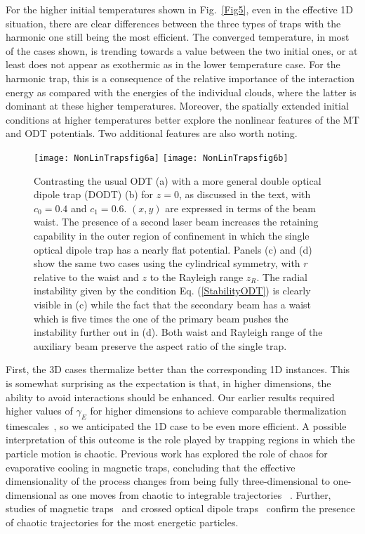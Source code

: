 \documentclass[pra,letterpaper,onecolumn,superscriptaddress,floatfix]{revtex4}
\begin{document}
For the higher initial temperatures shown in Fig.~\ref{Fig5}, even in the effective 1D situation, there are 
clear differences between the three types of traps with the harmonic one still being the most efficient. 
The converged temperature, in most of the cases shown, is trending towards a value between the two initial ones, 
or at least does not appear as exothermic as in the lower temperature case. For the harmonic trap, this is a consequence 
of the relative importance of the interaction energy as compared with the energies of the individual clouds, where 
the latter is dominant at these higher temperatures. Moreover, the spatially extended initial conditions at higher 
temperatures better explore the nonlinear features of the MT and ODT potentials.  
Two additional features are also worth noting. 

\begin{figure}[tb]
\texttt{[image: NonLinTrapsfig6a]}
\texttt{[image: NonLinTrapsfig6b]}
\caption{Contrasting the usual ODT (a) with a more general double optical dipole trap (DODT)
(b) for $z=0$, as discussed in the text, with $c_0=0.4$ and $c_1=0.6$. $(x,y)$ are expressed in
terms of the beam waist. The presence of a second laser beam increases the retaining capability in the outer region 
of confinement in which the single optical dipole trap has a nearly flat potential. Panels (c) and (d) show the same 
two cases using the cylindrical symmetry, with $r$ relative to the waist and $z$ to the Rayleigh range $z_R$.
The radial instability given by the condition Eq. (\ref{StabilityODT}) is clearly visible in (c) while the fact 
that the secondary beam has a waist which is five times the one of the primary beam pushes the instability further out in (d). 
Both waist and Rayleigh range of the auxiliary beam preserve the aspect ratio of the single trap.}
\label{Fig6}
\end{figure}

First, the 3D cases thermalize better than the corresponding 1D instances. This is somewhat surprising as the 
expectation is that, in higher dimensions, the ability to avoid interactions should be enhanced. 
Our earlier results required higher values of $\gamma_E$ for higher dimensions to achieve comparable 
thermalization timescales~\cite{JauOnoSun}, so we anticipated the 1D case to be even more efficient. 
A possible interpretation of this outcome is the role played by trapping regions in which the particle 
motion is chaotic. Previous work has explored the role of chaos for evaporative cooling in magnetic traps,
concluding that the effective dimensionality of the process changes from being fully three-dimensional
to one-dimensional as one moves from chaotic to integrable trajectories ~\cite{Surkov1,Surkov2,Pinkse,Harms}.
Further, studies of magnetic traps~\cite{Salas} and crossed optical dipole traps~\cite{Gonzalez} confirm
the presence of chaotic trajectories for the most energetic particles. 
\end{document}
